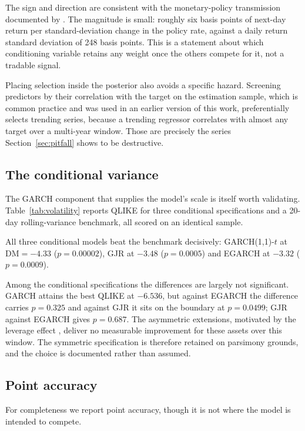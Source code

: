 The sign and direction are consistent with the monetary-policy transmission
documented by \citet{bernanke2005explains}. The magnitude is small: roughly six
basis points of next-day return per standard-deviation change in the policy
rate, against a daily return standard deviation of 248 basis points. This is a
statement about which conditioning variable retains any weight once the others
compete for it, not a tradable signal.

Placing selection inside the posterior also avoids a specific hazard. Screening
predictors by their correlation with the target on the estimation
sample, which is common practice and was used in an earlier version of this
work, preferentially selects trending series, because a trending regressor
correlates with almost any target over a multi-year window. Those are precisely
the series Section~\ref{sec:pitfall} shows to be destructive.

\subsection{The conditional variance}
\label{sec:variance}

The GARCH component that supplies the model's scale is itself worth validating.
Table~\ref{tab:volatility} reports QLIKE for three conditional specifications
and a 20-day rolling-variance benchmark, all scored on an identical sample.

All three conditional models beat the benchmark decisively: GARCH(1,1)-$t$ at
$\mathrm{DM}=-4.33$ ($p=0.00002$), GJR at $-3.48$ ($p=0.0005$) and EGARCH at
$-3.32$ ($p=0.0009$).

Among the conditional specifications the differences are largely not
significant. GARCH attains the best QLIKE at $-6.536$, but against EGARCH the
difference carries $p=0.325$ and against GJR it sits on the boundary at
$p=0.0499$; GJR against EGARCH gives $p=0.687$. The asymmetric extensions,
motivated by the leverage effect \citep{nelson1991conditional,
glosten1993relation}, deliver no measurable improvement for these assets over
this window. The symmetric specification is therefore retained on parsimony
grounds, and the choice is documented rather than assumed.

\subsection{Point accuracy}
\label{sec:mean}

For completeness we report point accuracy, though it is not where the model is
intended to compete.

